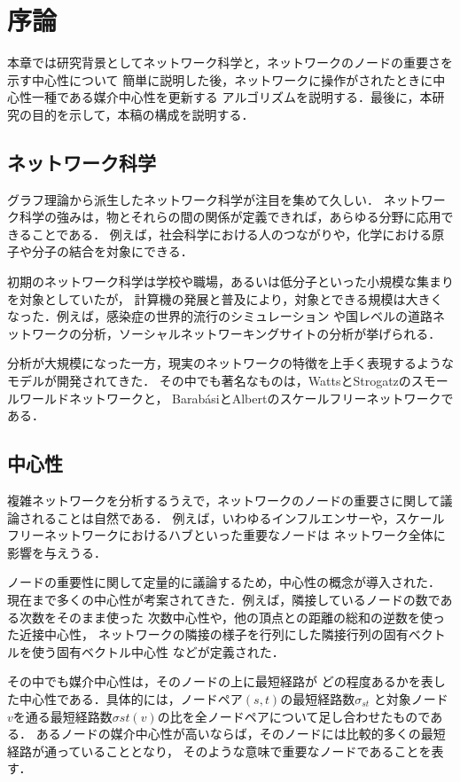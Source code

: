 \chapter{序論}
\label{chap:introduction}

本章では研究背景としてネットワーク科学と，ネットワークのノードの重要さを示す中心性について
簡単に説明した後，ネットワークに操作がされたときに中心性一種である媒介中心性を更新する
アルゴリズムを説明する．最後に，本研究の目的を示して，本稿の構成を説明する．

\section{ネットワーク科学}

グラフ理論から派生したネットワーク科学が注目を集めて久しい．
ネットワーク科学の強みは，物とそれらの間の関係が定義できれば，あらゆる分野に応用できることである．
例えば，社会科学における人のつながりや，化学における原子や分子の結合を対象にできる．

初期のネットワーク科学は学校や職場，あるいは低分子といった小規模な集まりを対象としていたが，
計算機の発展と普及により，対象とできる規模は大きくなった．例えば，感染症の世界的流行のシミュレーション
や国レベルの道路ネットワークの分析，ソーシャルネットワーキングサイトの分析が挙げられる．

分析が大規模になった一方，現実のネットワークの特徴を上手く表現するようなモデルが開発されてきた．
その中でも著名なものは，WattsとStrogatzのスモールワールドネットワーク\cite{Watts1998}と，
Barab{\'{a}}siとAlbertのスケールフリーネットワーク\cite{Barabasi1999}である．

\section{中心性}

複雑ネットワークを分析するうえで，ネットワークのノードの重要さに関して議論されることは自然である．
例えば，いわゆるインフルエンサーや，スケールフリーネットワークにおけるハブといった重要なノードは
ネットワーク全体に影響を与えうる．

ノードの重要性に関して定量的に議論するため，中心性の概念が導入された．
現在まで多くの中心性が考案されてきた．例えば，隣接しているノードの数である次数をそのまま使った
次数中心性や，他の頂点との距離の総和の逆数を使った近接中心性\cite{Beauchamp1965}，
ネットワークの隣接の様子を行列にした隣接行列の固有ベクトルを使う固有ベクトル中心性
\cite{Bonacich1991}などが定義された．

その中でも媒介中心性\cite{Freeman1977}は，そのノードの上に最短経路が
どの程度あるかを表した中心性である．具体的には，ノードペア$(s,t)$の最短経路数$\sigma_{st}$
と対象ノード$v$を通る最短経路数$\sigma{st}(v)$の比を全ノードペアについて足し合わせたものである．
あるノードの媒介中心性が高いならば，そのノードには比較的多くの最短経路が通っていることとなり，
そのような意味で重要なノードであることを表す．

